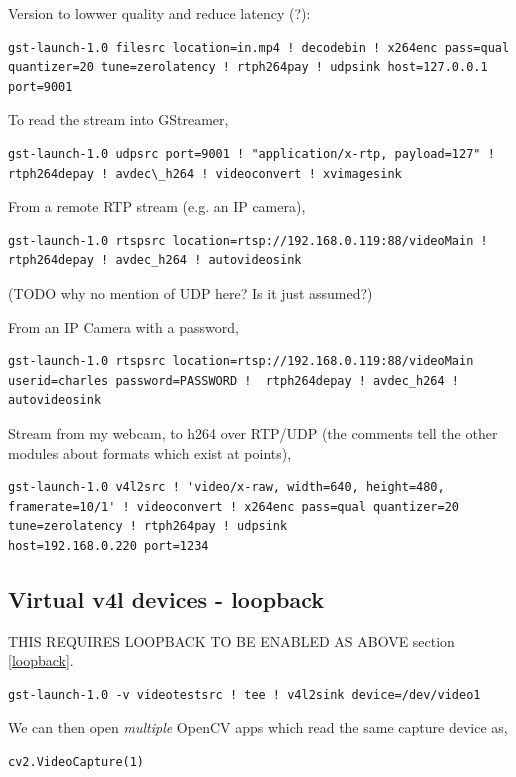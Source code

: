 \documentclass[oneside,english]{scrbook}
\begin{document}
Version to lowwer quality and reduce latency (?):
\begin{lstlisting}
gst-launch-1.0 filesrc location=in.mp4 ! decodebin ! x264enc pass=qual quantizer=20 tune=zerolatency ! rtph264pay ! udpsink host=127.0.0.1 port=9001
\end{lstlisting}

To read the stream into GStreamer,
\begin{lstlisting}
gst-launch-1.0 udpsrc port=9001 ! "application/x-rtp, payload=127" ! rtph264depay ! avdec\_h264 ! videoconvert ! xvimagesink
\end{lstlisting}

From a remote RTP stream (e.g. an IP camera),
\begin{lstlisting}
gst-launch-1.0 rtspsrc location=rtsp://192.168.0.119:88/videoMain !  rtph264depay ! avdec_h264 ! autovideosink
\end{lstlisting}
(TODO why no mention of UDP here? Is it just assumed?)

From an IP Camera with a password,
\begin{lstlisting}
gst-launch-1.0 rtspsrc location=rtsp://192.168.0.119:88/videoMain userid=charles password=PASSWORD !  rtph264depay ! avdec_h264 ! autovideosink
\end{lstlisting}

Stream from my webcam, to h264 over RTP/UDP (the comments tell the other modules about formats which exist at points),
\begin{lstlisting}
gst-launch-1.0 v4l2src ! 'video/x-raw, width=640, height=480, framerate=10/1' ! videoconvert ! x264enc pass=qual quantizer=20 tune=zerolatency ! rtph264pay ! udpsink
host=192.168.0.220 port=1234
\end{lstlisting}


\subsection{Virtual v4l devices - loopback}

THIS REQUIRES LOOPBACK TO BE ENABLED AS ABOVE section \ref{loopback}.

\begin{lstlisting}
gst-launch-1.0 -v videotestsrc ! tee ! v4l2sink device=/dev/video1 
\end{lstlisting}

We can then open {\em multiple} OpenCV apps which read the same capture device as,
\begin{lstlisting}
cv2.VideoCapture(1)
\end{lstlisting}
\end{document}
